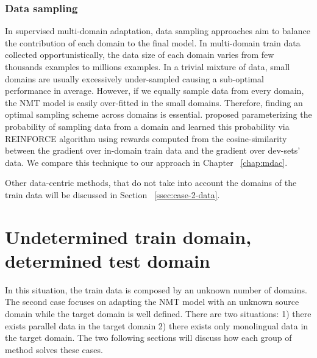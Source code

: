 \subsubsection{Data sampling}
In supervised multi-domain adaptation, data sampling approaches aim to balance the contribution of each domain to the final model. In multi-domain train data collected opportunistically, the data size of each domain varies from few thousands examples to millions examples. In a trivial mixture of data, small domains are usually excessively under-sampled causing a sub-optimal performance in average. However, if we equally sample data from every domain, the NMT model is easily over-fitted in the small domains. Therefore, finding an optimal sampling scheme across domains is essential. \citet{Wang20balancing} proposed parameterizing the probability of sampling data from a domain and learned this probability via REINFORCE algorithm \citet{Williams92simple} using rewards computed from the cosine-similarity between the gradient over in-domain train data and the gradient over dev-sets' data. We compare this technique to our approach in Chapter ~\ref{chap:mdac}.

Other data-centric methods, that do not take into account the domains of the train data will be discussed in Section ~\ref{ssec:case-2-data}.
\section{Undetermined train domain, determined test domain}
\label{sec:case2}
In this situation, the train data is composed by an unknown number of domains. The second case focuses on adapting the NMT model with an unknown source domain while the target domain is well defined. There are two situations: 1) there exists parallel data in the target domain 2) there exists only monolingual data in the target domain. The two following sections will discuss how each group of method solves these cases.
